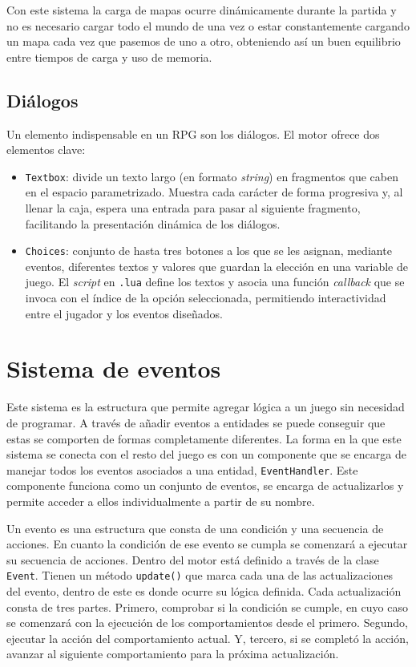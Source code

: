 Con este sistema la carga de mapas ocurre dinámicamente durante la partida y no es necesario cargar todo el mundo de una vez o estar constantemente cargando un mapa cada vez que pasemos de uno a otro, obteniendo así un buen equilibrio entre tiempos de carga y uso de memoria. 

\subsection{Diálogos}
Un elemento indispensable en un RPG son los diálogos. El motor ofrece dos elementos clave: 

\begin{itemize}
	\item \texttt{Textbox}: divide un texto largo (en formato \textit{string}) en fragmentos que caben en el espacio parametrizado. Muestra cada carácter de forma progresiva y, al llenar la caja, espera una entrada para pasar al siguiente fragmento, facilitando la presentación dinámica de los diálogos. 
	\item \texttt{Choices}: conjunto de hasta tres botones a los que se les asignan, mediante eventos, diferentes textos y valores que guardan la elección en una variable de juego. El \textit{script} en \texttt{.lua} define los textos y asocia una función \textit{callback} que se invoca con el índice de la opción seleccionada, permitiendo interactividad entre el jugador y los eventos diseñados.
\end{itemize}

\section{Sistema de eventos}
\label{sec:eventos}
Este sistema es la estructura que permite agregar lógica a un juego sin necesidad de programar. A través de añadir eventos a entidades se puede conseguir que estas se comporten de formas completamente diferentes. La forma en la que este sistema se conecta con el resto del juego es con un componente que se encarga de manejar todos los eventos asociados a una entidad, \texttt{EventHandler}. Este componente funciona como un conjunto de eventos, se encarga de actualizarlos y permite acceder a ellos individualmente a partir de su nombre.

\medskip

Un evento es una estructura que consta de una condición y una secuencia de acciones. En cuanto la condición de ese evento se cumpla se comenzará a ejecutar su secuencia de acciones. Dentro del motor está definido a través de la clase \texttt{Event}. Tienen un método \texttt{update()} que marca cada una de las actualizaciones del evento, dentro de este es donde ocurre su lógica definida. Cada actualización consta de tres partes. Primero, comprobar si la condición se cumple, en cuyo caso se comenzará con la ejecución de los comportamientos desde el primero. Segundo, ejecutar la acción del comportamiento actual. Y, tercero, si se completó la acción, avanzar al siguiente comportamiento para la próxima actualización. 

